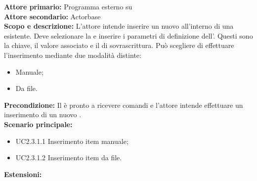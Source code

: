 \documentclass{scalatekids-article}
\begin{document}
\textbf{Attore primario:} Programma esterno su \\
\textbf{Attore secondario:} Actorbase\\
\textbf{Scopo e descrizione:} L'attore intende inserire un nuovo  all'interno di una  esistente. Deve selezionare la  e inserire i parametri di definizione dell'. Questi sono la chiave, il valore associato e il  di sovrascrittura. Può scegliere di effettuare l'inserimento mediante due modalità distinte:
\begin{itemize}
\item Manuale;
\item Da file.
\end{itemize}
\textbf{Precondizione:} Il  è pronto a ricevere comandi e l'attore intende effettuare un inserimento di un nuovo .\\
\textbf{Scenario principale:}
\begin{itemize}
\item UC2.3.1.1 Inserimento item manuale;
\item UC2.3.1.2 Inserimento item da file.
\end{itemize}
\textbf{Estensioni:}
\end{document}
